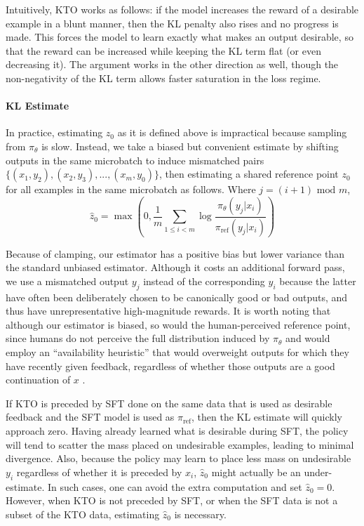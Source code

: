 Intuitively, KTO works as follows: if the model increases the reward of a desirable example in a blunt manner, then the KL penalty also rises and no progress is made.
This forces the model to learn exactly what makes an output desirable, so that the reward can be increased while keeping the KL term flat (or even decreasing it).
The argument works in the other direction as well, though the non-negativity of the KL term allows faster saturation in the loss regime.

\paragraph{KL Estimate}
In practice, estimating $z_0$ as it is defined above is impractical because sampling from $\pi_\theta$ is slow.
Instead, we take a biased but convenient estimate by shifting outputs in the same microbatch to induce mismatched pairs $\{ (x_1, y_2), (x_2, y_3), ..., (x_m, y_0) \}$, then estimating a shared reference point $z_0$ for all examples in the same microbatch as follows.
Where $j = (i+1) \text{ mod } m$,
$$\hat{z}_\text{0} = \max\left(0, \frac{1}{m} \sum_{1 \leq i < m} \log \frac{ \pi_\theta(y_{j}|x_i)}{\pi_\text{ref}(y_{j}|x_i)}\right)$$

Because of clamping, our estimator has a positive bias but lower variance than the standard unbiased estimator.
Although it costs an additional forward pass, we use a mismatched output $y_j$ instead of the corresponding $y_i$ because the latter have often been deliberately chosen to be canonically good or bad outputs, and thus have unrepresentative high-magnitude rewards.
It is worth noting that although our estimator is biased, so would the human-perceived reference point, since humans do not perceive the full distribution induced by $\pi_\theta$ and would employ an “availability heuristic” that would overweight outputs for which they have recently given feedback, regardless of whether those outputs are a good continuation of $x$ \citep{tversky1973availability}.

If KTO is preceded by SFT done on the same data that is used as desirable feedback and the SFT model is used as $\pi_\text{ref}$, then the KL estimate will quickly approach zero.
Having already learned what is desirable during SFT, the policy will tend to scatter the mass placed on undesirable examples, leading to minimal divergence.
Also, because the policy may learn to place less mass on undesirable $y_i$ regardless of whether it is preceded by $x_i$, $\hat{z}_0$ might actually be an under-estimate.
In such cases, one can avoid the extra computation and set $\hat{z}_0 = 0$.
However, when KTO is not preceded by SFT, or when the SFT data is not a subset of the KTO data, estimating $\hat{z}_0$ is necessary.

